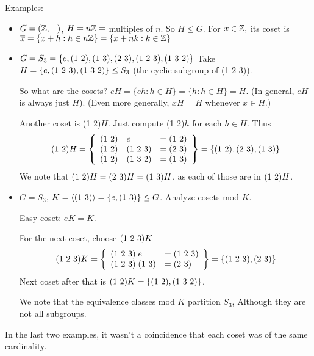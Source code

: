 \documentclass[notes.tex]{subfiles}
\begin{document}
Examples:
\begin{itemize}
	\item $G = (\mathbb{Z}, +)$, $H = n\mathbb{Z} = $ multiples of $n$.
	So $H\le G$. For $x\in\mathbb{Z},$ its coset is $\overline{x} = \{x+h:h\in n\mathbb{Z}\} = \{x + nk:k\in\mathbb{Z}\}$
	\item $G = S_3 = \{e, \text{(1 2)}, \text{(1 3)}, \text{(2 3)}, \text{(1 2 3)}, \text{(1 3 2)}\}$
	Take $H = \{e, \text{(1 2 3)}, \text{(1 3 2)}\} \le S_3$ (the cyclic subgroup of (1 2 3)).

	So what are the cosets? $eH = \{eh: h\in H\} = \{h : h \in H\} = H$.
	(In general, $eH$ is always just $H$). (Even more generally, $xH = H$ whenever $x\in H$.)

	Another coset is (1 2)$H$.
	Just compute (1 2)$h$ for each $h\in H$.
	Thus \[
		\text{(1 2)}H = \left\{
		\begin{array}{rll}
		 	\text{(1 2)}&e &= \text{(1 2)}\\
			\text{(1 2)}&\text{(1 2 3)} &= \text{(2 3)}\\
			\text{(1 2)}&\text{(1 3 2)} &= \text{(1 3)}\\
		 \end{array}
		 \right\} = \{\text{(1 2)}, \text{(2 3)}, \text{(1 3)}\}
	\]
	We note that $\text{(1 2)}H = \text{(2 3)}H = \text{(1 3)}H$, as each of those
	are in $\text{(1 2)}H$.


	\item
	$G = S_3$, $K = \langle\text{(1 3)}\rangle  = \{e, \text{(1 3)}\} \le G$.
	Analyze cosets mod $K$.

	Easy coset: $eK = K$.

	For the next coset, choose $\text{(1 2 3)}K$
	\[
		\text{(1 2 3)}K = \left\{
		\begin{array}{ll}
		 	\text{(1 2 3)} \;e &= \text{(1 2 3)}\\
			\text{(1 2 3)} \;\text{(1 3)} &= \text{(2 3)}\\
		 \end{array}
		 \right\} = \{\text{(1 2 3)}, \text{(2 3)}\}
	\]
	Next coset after that is  $\text{(1 2)}K = \{\text{(1 2)}, \text{(1 3 2)}\}$.

	We note that the equivalence classes mod $K$ partition $S_3$, Although they are not all subgroups.
\end{itemize}

In the last two examples, it wasn't a coincidence that each coset was of the same cardinality.
\end{document}
